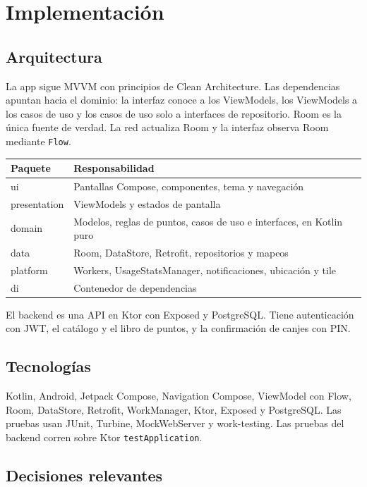 \section{Implementación}

\subsection{Arquitectura}

La app sigue MVVM con principios de Clean Architecture. Las dependencias apuntan hacia el dominio: la
interfaz conoce a los ViewModels, los ViewModels a los casos de uso y los casos de uso solo a interfaces
de repositorio. Room es la única fuente de verdad. La red actualiza Room y la interfaz observa Room
mediante \texttt{Flow}.

\begin{tabularx}{\linewidth}{@{}>{\ttfamily}l L@{}}
\toprule
Paquete & Responsabilidad \\
\midrule
ui & Pantallas Compose, componentes, tema y navegación \\
presentation & ViewModels y estados de pantalla \\
domain & Modelos, reglas de puntos, casos de uso e interfaces, en Kotlin puro \\
data & Room, DataStore, Retrofit, repositorios y mapeos \\
platform & Workers, UsageStatsManager, notificaciones, ubicación y tile \\
di & Contenedor de dependencias \\
\bottomrule
\end{tabularx}

El backend es una API en Ktor con Exposed y PostgreSQL. Tiene autenticación con JWT, el catálogo y el
libro de puntos, y la confirmación de canjes con PIN.

\subsection{Tecnologías}

Kotlin, Android, Jetpack Compose, Navigation Compose, ViewModel con Flow, Room, DataStore, Retrofit,
WorkManager, Ktor, Exposed y PostgreSQL. Las pruebas usan JUnit, Turbine, MockWebServer y work-testing.
Las pruebas del backend corren sobre Ktor \texttt{testApplication}.

\subsection{Decisiones relevantes}

